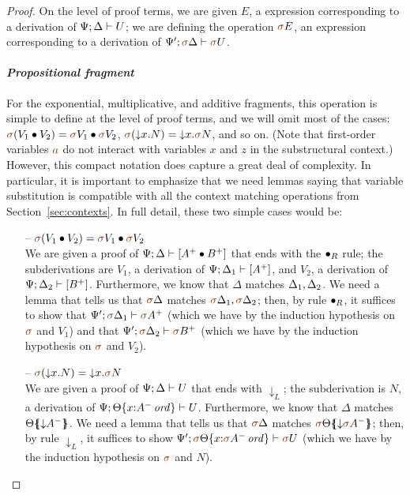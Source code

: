 \begin{proof}
On the level of proof terms, 
we are given $E$, a expression corresponding to a derivation of
${\Psi};{\Delta} \vdash {U} \mathstrut$; we are defining the operation $\lf\sigma{E}$,
an expression corresponding to a derivation of 
$\foc{\Psi'}{\lf\sigma\Delta}{\lf\sigma{U}}$.

\paragraph{\it Propositional fragment}
For the exponential, multiplicative, and additive fragments, this
operation is simple to define at the level of proof terms, and we will
omit most of the cases: $\lf\sigma(\tfuser{V_1}{V_2}) =
\tfuser{\lf\sigma{V_1}}{\lf\sigma{V_2}}$, $\lf\sigma(\tdownl{x}{N}) =
\tdownl{x}{\lf\sigma N}$, and so on. (Note that first-order variables
$\lf{a}$ do not interact with variables $x$ and $z$ in the substructural
context.) However, this compact notation does
capture a great deal of complexity. In particular, it is important to
emphasize that we need lemmas saying that variable substitution is
compatible with all the context matching operations from
Section~\ref{sec:contexts}.  In full detail, these two simple cases
would be:

\begin{itemize}

\item[--]
$\lf\sigma(\tfuser{V_1}{V_2}) = \tfuser{\lf\sigma{V_1}}{\lf\sigma{V_2}}$\smallskip\\
We are given a proof of ${\Psi};{\Delta} \vdash {[A^+ \mathbin{\bullet}B^+]} \mathstrut$ that
ends with the ${\mathbin{\bullet}}_R$ rule; the subderivations are
$V_1$, a derivation of ${\Psi};{\Delta_1} \vdash {[A^+]} \mathstrut$, and
$V_2$, a derivation of ${\Psi};{\Delta_2} \vdash {[B^+]} \mathstrut$. Furthermore, we know that
$\Delta$ matches ${\Delta_1},{\Delta_2}$. We need a lemma that
tells us that $\lf\sigma\Delta$ matches $\lf\sigma\Delta_1, \lf\sigma\Delta_2$;
then, by rule ${\mathbin{\bullet}}_R$, it suffices to show that
$\foc{\Psi'}{\lf\sigma\Delta_1}{\lf\sigma{A^+}}$ (which we have by the 
induction hypothesis on $\lf\sigma$ and $V_1$) and that
$\foc{\Psi'}{\lf\sigma\Delta_2}{\lf\sigma{B^+}}$ 
(which we have by the induction hypothesis
on $\lf\sigma$ and $V_2$). \smallskip

\item[--]
$\lf\sigma(\tdownl{x}{N}) = \tdownl{x}{\lf\sigma N}$ \smallskip\\ 
We are given a proof
of ${\Psi};{\Delta} \vdash {U} \mathstrut$ that ends with ${\downarrow}_L$; 
the subderivation is $N$, a derivation of
${\Psi};{{\Theta}\{{x{:}{A^-}\,{{\it ord}}}\}} \vdash {U} \mathstrut$. Furthermore, we know that
$\Delta$ matches ${\Theta}\mbox{$\{\hspace{-4pt}\{$}{{\downarrow}A^-}\mbox{$\}\hspace{-4pt}\}$}$. We need a lemma
that tells us that $\lf\sigma\Delta$ matches
$\frameoff{\lf\sigma\Theta}{{\downarrow}\lf\sigma A^-}$; then, by 
rule ${\downarrow}_L$, it suffices to show 
$\foc{\Psi'}{\tackon{\lf\sigma\Theta}{x{:}\istrue{\lf\sigma{A^-}}}}{\lf\sigma{U}}$ 
(which we have by the induction hypothesis on $\lf\sigma$ and $N$).


\end{itemize}
\end{proof}
